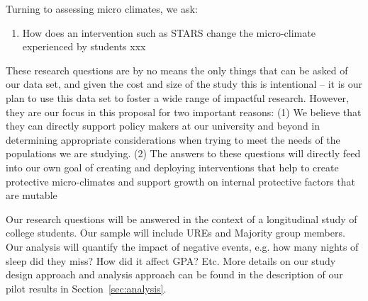 \noindent Turning to assessing micro climates, we ask:

\begin{enumerate}[start=3,label={\bfseries RQ\arabic*}, leftmargin=1cm]
   \item \label{itm:intervention1} How does an intervention such as STARS change the micro-climate experienced by students xxx 
\end{enumerate}

\noindent
These research questions are by no means the only things that can be asked of our data set, and given the cost and size of the study this is intentional -- it is our plan to use this data set to foster a wide range of impactful research. However, they are our focus in this proposal for two important reasons:
(1) We believe that they can directly support policy makers at our university and beyond in determining appropriate considerations when trying to meet the needs of the populations we are studying. 
(2) The answers to these questions will directly feed into our own goal of creating and deploying interventions that help to create protective micro-climates and support growth on internal protective factors that are mutable
 
Our research questions will be answered in the context of a longitudinal study of college students. Our sample will include UREs and Majority group members. %
Our analysis will quantify the impact of negative events, e.g. how many nights of sleep did they miss? How did it affect GPA? Etc. More details on our study design approach and analysis approach can be found in the description of our pilot results in Section~\ref{sec:analysis}. 

